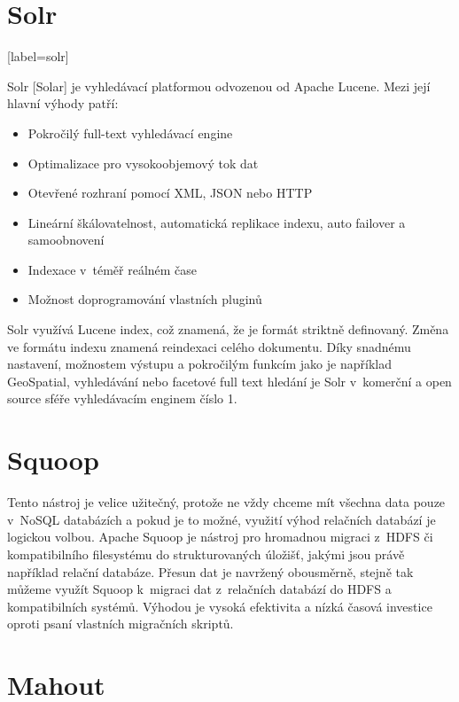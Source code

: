 \section{Solr}[label=solr]

Solr [Solar] je vyhledávací platformou odvozenou od Apache Lucene. Mezi její hlavní výhody patří:

\begin{itemize}
\item Pokročilý full-text vyhledávací engine
\item Optimalizace pro vysokoobjemový tok dat
\item Otevřené rozhraní pomocí XML, JSON nebo HTTP
\item Lineární škálovatelnost, automatická replikace indexu, auto failover a samoobnovení
\item Indexace v~téměř reálném čase
\item Možnost doprogramování vlastních pluginů
\end{itemize}

Solr využívá Lucene index, což znamená, že je formát striktně definovaný. Změna ve formátu indexu znamená reindexaci celého dokumentu. Díky snadnému nastavení, možnostem výstupu a pokročilým funkcím jako je například GeoSpatial, vyhledávání nebo facetové full text hledání je Solr v~komerční a open source sféře vyhledávacím enginem číslo 1.


\section{Squoop}

Tento nástroj je velice užitečný, protože ne vždy chceme mít všechna data pouze v~NoSQL databázích a pokud je to možné, využití výhod relačních databází je logickou volbou. Apache Squoop je nástroj pro hromadnou migraci z~HDFS či kompatibilního filesystému do strukturovaných úložišť, jakými jsou právě například relační databáze. Přesun dat je navržený obousměrně, stejně tak můžeme využít Squoop k~migraci dat z~relačních databází do HDFS a kompatibilních systémů. Výhodou je vysoká efektivita a nízká časová investice oproti psaní vlastních migračních skriptů.

\section{Mahout}

